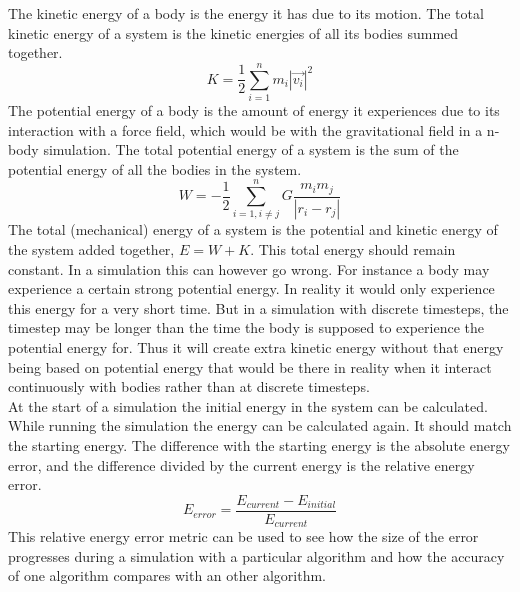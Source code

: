 \documentclass[11pt]{article} %
\begin{document}
The kinetic energy of a body is the energy it has due to its motion. The total kinetic energy of a system is the kinetic energies of all its bodies summed together.
\begin{equation}
    K = \frac{1}{2} \sum_{i=1}^n m_i |\vec{v_i}|^2
\end{equation}
The potential energy of a body is the amount of energy it experiences due to its interaction with a force field, which would be with the gravitational field in a n-body simulation. The total potential energy of a system is the sum of the potential energy of all the bodies in the system.
\begin{equation}
    W = -\frac{1}{2} \sum_{i=1, i \neq j}^n G \frac{m_i m_j}{|r_i - r_j|}
\end{equation}
The total (mechanical) energy of a system is the potential and kinetic energy of the system added together, $E = W+K$. This total energy should remain constant. In a simulation this can however go wrong. For instance a body may experience a certain strong potential energy. In reality it would only experience this energy for a very short time. But in a simulation with discrete timesteps, the timestep may be longer than the time the body is supposed to experience the potential energy for. Thus it will create extra kinetic energy without that energy being based on potential energy that would be there in reality when it interact continuously with bodies rather than at discrete timesteps. \\
At the start of a simulation the initial energy in the system can be calculated. While running the simulation the energy can be calculated again. It should match the starting energy. The difference with the starting energy is the absolute energy error, and the difference divided by the current energy is the relative energy error.
\begin{equation}
    E_{error} = \frac{E_{current} - E_{initial}}{E_{current}}
\end{equation}
This relative energy error metric can be used to see how the size of the error progresses during a simulation with a particular algorithm and how the accuracy of one algorithm compares with an other algorithm.
\end{document}
